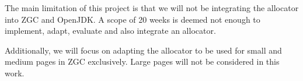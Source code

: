 
The main limitation of this project is that we will not be integrating the allocator into ZGC and OpenJDK. A scope of 20 weeks is deemed not enough to implement, adapt, evaluate and also integrate an allocator.

Additionally, we will focus on adapting the allocator to be used for small and medium pages in ZGC exclusively. Large pages will not be considered in this work.


